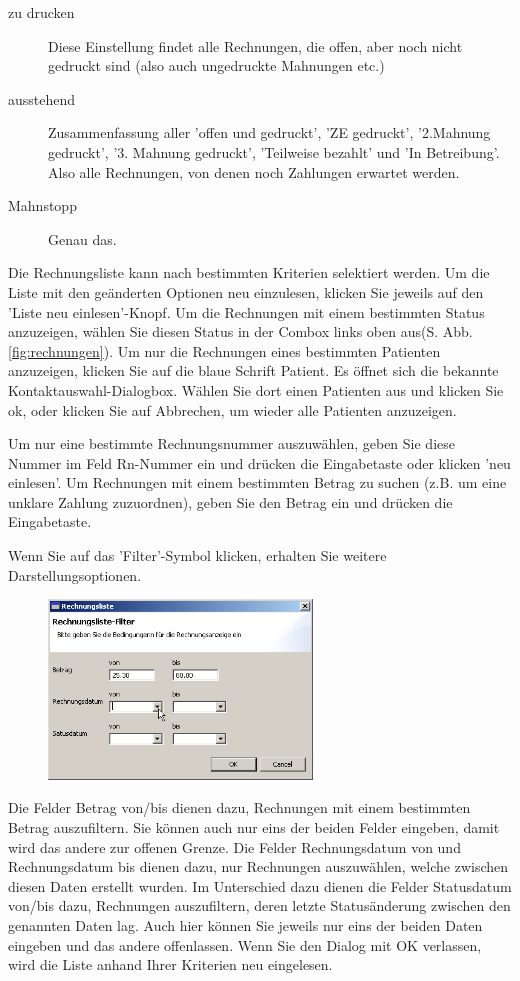 \begin{description}
    \item [zu drucken] Diese Einstellung findet alle Rechnungen, die offen, aber noch nicht gedruckt sind (also auch ungedruckte Mahnungen etc.)
    \item [ausstehend] Zusammenfassung aller 'offen und gedruckt', 'ZE gedruckt', '2.Mahnung gedruckt', '3. Mahnung gedruckt', 'Teilweise bezahlt' und 'In Betreibung'. Also alle Rechnungen, von denen noch Zahlungen erwartet werden.
    \item [Mahnstopp] Genau das.
\end{description}

Die Rechnungsliste kann nach bestimmten Kriterien selektiert werden. Um die Liste mit den geänderten Optionen neu einzulesen, klicken Sie jeweils auf den 'Liste neu einlesen'-Knopf.
Um die Rechnungen mit einem bestimmten Status anzuzeigen, wählen Sie diesen Status in der Combox links oben aus(S. Abb. \ref{fig:rechnungen}). Um nur die Rechnungen eines bestimmten Patienten anzuzeigen, klicken Sie auf die blaue Schrift \glqq Patient\grqq{}. Es öffnet sich die bekannte Kontaktauswahl-Dialogbox. Wählen Sie dort einen Patienten aus und klicken Sie ok, oder klicken Sie auf Abbrechen, um wieder alle Patienten anzuzeigen.

Um nur eine bestimmte Rechnungsnummer auszuwählen, geben Sie diese Nummer im Feld Rn-Nummer ein und drücken die Eingabetaste oder klicken 'neu einlesen'. Um Rechnungen mit einem bestimmten Betrag zu suchen (z.B. um eine unklare Zahlung zuzuordnen), geben Sie den Betrag ein und drücken die Eingabetaste.

\medskip
Wenn Sie auf das 'Filter'-Symbol klicken, erhalten Sie weitere Darstellungsoptionen.

\begin{figure}
\includegraphics[width=7cm]{images/rechnungsfilter}
\end{figure}
Die Felder Betrag von/bis dienen dazu, Rechnungen mit einem bestimmten Betrag auszufiltern. Sie können auch nur eins der beiden Felder eingeben, damit wird das andere zur offenen Grenze.
Die Felder \glqq Rechnungsdatum von\grqq{} und \glqq Rechnungsdatum bis\grqq{} dienen dazu, nur Rechnungen auszuwählen, welche zwischen diesen Daten erstellt wurden. Im Unterschied dazu dienen die Felder \glqq Statusdatum von/bis\grqq{} dazu, Rechnungen auszufiltern, deren letzte Statusänderung zwischen den genannten Daten lag. Auch hier können Sie jeweils nur eins der beiden Daten eingeben und das andere offenlassen.
Wenn Sie den Dialog mit OK verlassen, wird die Liste anhand Ihrer Kriterien neu eingelesen.
\medskip

